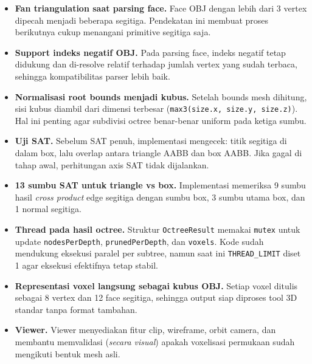 \documentclass[11pt,a4paper]{article}
\begin{document}
\begin{itemize}
    \item \textbf{Fan triangulation saat parsing face.}
    Face OBJ dengan lebih dari 3 vertex dipecah menjadi beberapa segitiga.
    Pendekatan ini membuat proses berikutnya cukup menangani primitive segitiga saja.

    \item \textbf{Support indeks negatif OBJ.}
    Pada parsing face, indeks negatif tetap didukung dan di-resolve relatif terhadap
    jumlah vertex yang sudah terbaca, sehingga kompatibilitas parser lebih baik.

    \item \textbf{Normalisasi root bounds menjadi kubus.}
    Setelah bounds mesh dihitung, sisi kubus diambil dari dimensi terbesar
    (\texttt{max3(size.x, size.y, size.z)}). Hal ini penting agar subdivisi octree
    benar-benar uniform pada ketiga sumbu.

    \item \textbf{Uji SAT.}
    Sebelum SAT penuh, implementasi mengecek:
    titik segitiga di dalam box, lalu overlap antara triangle AABB dan box AABB.
    Jika gagal di tahap awal, perhitungan axis SAT tidak dijalankan.

    \item \textbf{13 sumbu SAT untuk triangle vs box.}
    Implementasi memeriksa 9 sumbu hasil \textit{cross product} edge segitiga
    dengan sumbu box, 3 sumbu utama box, dan 1 normal segitiga.

    \item \textbf{Thread pada hasil octree.}
    Struktur \texttt{OctreeResult} memakai \texttt{mutex} untuk update
    \texttt{nodesPerDepth}, \texttt{prunedPerDepth}, dan \texttt{voxels}.
    Kode sudah mendukung eksekusi paralel per subtree, namun saat ini
    \texttt{THREAD\_LIMIT} diset 1 agar eksekusi efektifnya tetap stabil.

    \item \textbf{Representasi voxel langsung sebagai kubus OBJ.}
    Setiap voxel ditulis sebagai 8 vertex dan 12 face segitiga, sehingga
    output siap diproses tool 3D standar tanpa format tambahan.

    \item \textbf{Viewer.}
    Viewer menyediakan fitur clip, wireframe, orbit camera, dan
    membantu memvalidasi (\textit{secara visual}) apakah voxelisasi permukaan sudah mengikuti bentuk mesh asli.
\end{itemize}
\end{document}
